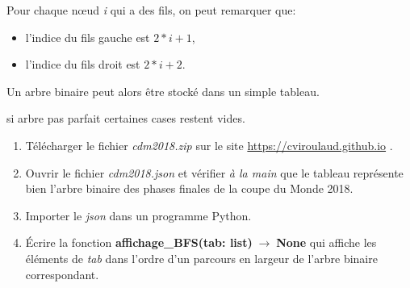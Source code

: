 \documentclass[a4paper,11pt]{article}
\begin{document}
\begin{Form}
Pour chaque nœud \emph{i} qui a des fils, on peut remarquer que:
\begin{itemize}
\item l'indice du fils gauche est $2*i+1$,
\item l'indice du fils droit est $2*i+2$.
\end{itemize}
Un arbre binaire peut alors être stocké dans un simple tableau.
\begin{center}
\label{stocke}
\end{center}

\begin{commentprof}
si arbre pas parfait certaines cases restent vides.
\end{commentprof}
\begin{activite}
\begin{enumerate}
\item Télécharger le fichier \emph{cdm2018.zip} sur le site \url{https://cviroulaud.github.io} .
\item Ouvrir le fichier \emph{cdm2018.json} et vérifier \emph{à la main} que le tableau représente bien l'arbre binaire des phases finales de la coupe du Monde 2018.
\item Importer le \emph{json} dans un programme Python.
\item Écrire la fonction \textbf{affichage\_BFS(tab: list)$\;\rightarrow\;$None} qui affiche les éléments de \emph{tab} dans l'ordre d'un parcours en largeur de l'arbre binaire correspondant.
\end{enumerate}
\end{activite}
\end{Form}
\end{document}
